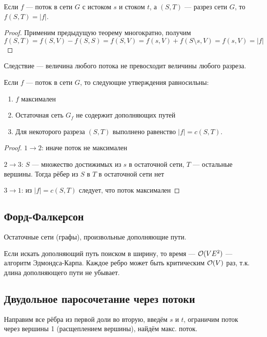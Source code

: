 \begin{theorem}
    Если $f$ --- поток в сети $G$ с истоком $s$
    и стоком $t$, а $(S, T)$ --- разрез сети $G$,
    то $f(S, T) = |f|$.
\end{theorem}
\begin{proof}
    Применим предыдущую теорему многократно, получим
    \[
        f(S, T) = f(S, V) - f(S, S) = f(S, V)
        = f(s, V) + f(S \setminus s, V) = f(s, V) = |f|
    \]
\end{proof}

Следствие --- величина любого
потока не превосходит
величины любого разреза.

\begin{theorem}
    Если $f$ --- поток в сети $G$,
    то следующие утверждения равносильны:
    \begin{enumerate}
        \item $f$ максимален
        \item Остаточная сеть $G_f$ не содержит дополняющих путей
        \item Для некоторого разреза $(S, T)$ выполнено
        равенство $|f| = c(S, T)$.
    \end{enumerate}
\end{theorem}
\begin{proof}
    $1 \to 2$: иначе поток не максимален

    $2 \to 3$: $S$ --- множество достижимых из $s$ в остаточной сети,
    $T$ --- остальные вершины.
    Тогда рёбер из $S$ в $T$ в остаточной сети нет

    $3 \to 1$: из $|f| = c(S, T)$ следует, что поток максимален
\end{proof}

\subsection{Форд-Фалкерсон}
Остаточные сети (графы), произвольные дополняющие пути.

Если искать дополняющий путь поиском в ширину,
то время --- $\mathcal{O}(VE^2)$ --- алгоритм Эдмондса-Карпа.
Каждое ребро может быть критическим $\mathcal{O}(V)$ раз,
т.к. длина дополняющего пути не убывает.

\subsection{Двудольное паросочетание через потоки}
Направим все рёбра из первой доли во вторую,
введём $s$ и $t$,
ограничим поток через вершины 1
(расщеплением вершины),
найдём макс. поток.
